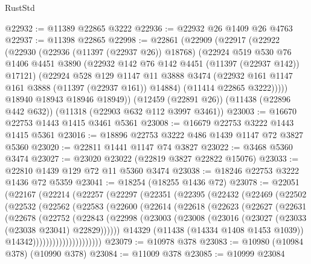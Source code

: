 \begin{lexlean}{RustStd}
\begin{coremodule}
@22932 := @11389 @22865 @3222
@22936 := @22932 @26 @1409 @26 @4763
@22937 := @11398 @22865
@22998 := @22861
    (@22909
      (@22917
        (@22922
          (@22930
            (@22936 (@11397 (@22937 @26)) @18768)
            (@22924
              @519
              @530
              @76
              @1406
              @4451
              @3890
              (@22932 @142 @76 @142 @4451 (@11397 (@22937 @142)) @17121)
              (@22924
                @528
                @129
                @1147
                @11
                @3888
                @3474
                (@22932 @161 @1147 @161 @3888 (@11397 (@22937 @161)) @14884)
                (@11414 @22865 @3222)))))
        @18940
        @18943
        @18946
        @18949))
    (@12459 (@22891 @26))
    (@11438 (@22896 @442 @632))
    (@11318 (@22903 @632 @112 @3997 @3461))
@23003 := @16670 @22753 @1443 @1415 @3461 @5361
@23008 := @16679 @22753 @3222 @1443 @1415 @5361
@23016 := @18896 @22753 @3222 @486 @1439 @1147 @72 @3827 @5360
@23020 := @22811 @1441 @1147 @74 @3827
@23022 := @3468 @5360 @3474
@23027 := @23020 @23022 (@22819 @3827 @22822 @15076)
@23033 := @22810 @1439 @129 @72 @11 @5360 @3474
@23038 := @18246 @22753 @3222 @1436 @72 @5359
@23041 := @18254 (@18255 @1436 @72)
@23078 := @22051
    (@22167
      (@22214
        (@22257
          (@22297
            (@22351
              (@22395
                (@22432
                  (@22469
                    (@22502
                      (@22532
                        (@22562
                          (@22583
                            (@22600
                              (@22614
                                (@22618
                                  (@22623
                                    (@22627
                                      (@22631
                                        (@22678
                                          (@22752
                                            (@22843
                                              (@22998
                                                (@23003
                                                  (@23008
                                                    (@23016
                                                      (@23027 (@23033 (@23038 @23041) @22829))))))
                                              @14329
                                              (@11438 (@14334 @1408 @1453 @1039))
                                              @14342)))))))))))))))))))))
@23079 := @10978 @378
@23083 := @10980 (@10984 @378) (@10990 @378)
@23084 := @11009 @378
@23085 := @10999 @23084

\end{coremodule}
\end{lexlean}
